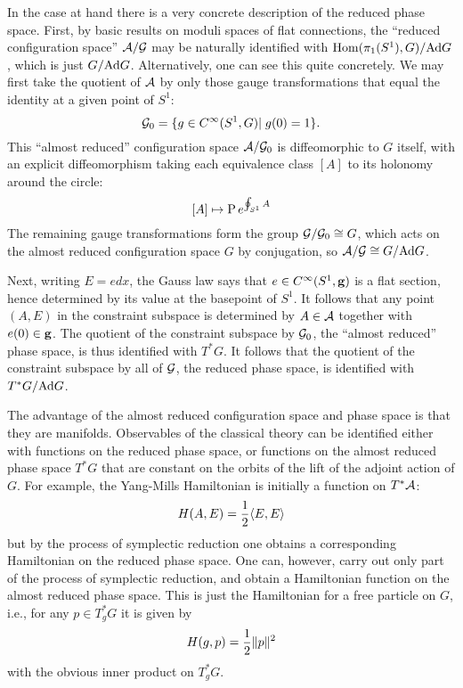 \documentclass[12pt]{article}
\newcommand\Hom{{\rm Hom}}
\newcommand{\A}{{\cal A}}
\newcommand{\G}{{\cal G}}
\newcommand{\g}{{\bf  g}}	%
\newcommand{\hf}{{1\over 2}}
\newcommand{\Ad}{{\rm Ad}}
\begin{document}
In the case at hand there is a very concrete description of the reduced
phase space.  First, by basic results on moduli spaces of flat
connections, the ``reduced configuration space''
$\A/\G$ may be naturally identified with $\Hom(\pi_1(S^1),G)/\Ad G$, which
is just $G/\Ad G$.   Alternatively, one can see this quite concretely.
We may first take the quotient of $\A$
by only those gauge transformations that equal the identity at a given point
of $S^1$:
\[      \G_0 = \{ g \in C^\infty(S^1,G) | \; g(0) = 1 \}.\]
This ``almost reduced'' configuration space
$\A/\G_0$ is diffeomorphic to $G$ itself, with an
explicit diffeomorphism taking each equivalence class
$[A]$ to its holonomy around the circle:
\[         [A] \mapsto {\rm P}\, e^{ \oint_{S^1} A } \]
The remaining gauge transformations form the group $\G/\G_0 \cong G$,
which acts on the almost reduced configuration space $G$ by conjugation, so
$\A/\G \cong G/\Ad G$.

Next, writing $E = edx$, the Gauss law says that $e \in C^\infty(S^1,\g)$
is a flat section, hence determined by its value at the basepoint of $S^1$.
It follows that any point $(A,E)$ in the constraint subspace is determined
by $A \in \A$ together with $e(0) \in \g$.  The quotient of the constraint
subspace by $\G_0$, the ``almost reduced'' phase space, is thus identified
with $T^\ast G$.  It follows that the quotient of the constraint subspace
by all of $\G$, the reduced phase space, is identified with $T^\ast
G/\Ad G$.

The advantage of the almost reduced configuration space and phase space is
that they are manifolds.  Observables of the classical theory can be
identified either with functions on the reduced phase space, or functions
on the almost reduced phase space $T^\ast G$ that are constant on the
orbits of the lift of the adjoint action of $G$.
For example, the Yang-Mills Hamiltonian is initially a function on $T^\ast \A$:
\[       H(A,E) = \hf  \langle E,E\rangle  \]
but by the process of symplectic reduction one obtains a corresponding
Hamiltonian on the reduced phase space.   One can, however,
carry out only part of the process of symplectic
reduction, and obtain a Hamiltonian function on the almost reduced phase
space.     This is just the Hamiltonian for a free particle
on $G$, i.e., for any $p \in T^\ast_g G$ it is given by
\[        H(g,p) = \hf \|p\|^2  \]
with the obvious inner product on $T^\ast_g G$.
\end{document}
